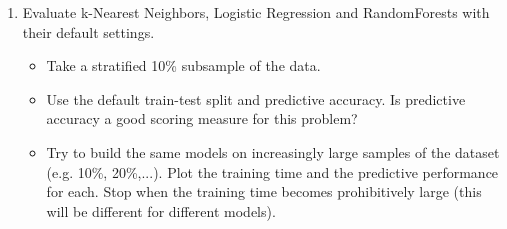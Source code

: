 \documentclass[11pt]{article}
\providecommand{\tightlist}{%
      \setlength{\itemsep}{0pt}\setlength{\parskip}{0pt}}
\begin{document}
    \begin{enumerate}
\def\labelenumi{\arabic{enumi}.}
\tightlist
\item
  Evaluate k-Nearest Neighbors, Logistic Regression and RandomForests
  with their default settings.

  \begin{itemize}
  \tightlist
  \item
    Take a stratified 10\% subsample of the data.
  \item
    Use the default train-test split and predictive accuracy. Is
    predictive accuracy a good scoring measure for this problem?
  \item
    Try to build the same models on increasingly large samples of the
    dataset (e.g. 10\%, 20\%,...). Plot the training time and the
    predictive performance for each. Stop when the training time becomes
    prohibitively large (this will be different for different models).
  \end{itemize}
\end{enumerate}
\end{document}
